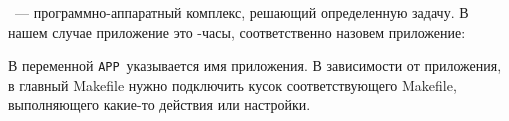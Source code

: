 
\ --- программно-аппаратный комплекс, решающий определенную
задачу. В нашем случае приложение это \linux-часы, соответственно назовем
приложение:



В переменной \verb|APP|\ указывается имя приложения. 
В зависимости от приложения, в главный Makefile нужно подключить кусок
соответствующего Makefile, выполняющего какие-то действия или настройки.






